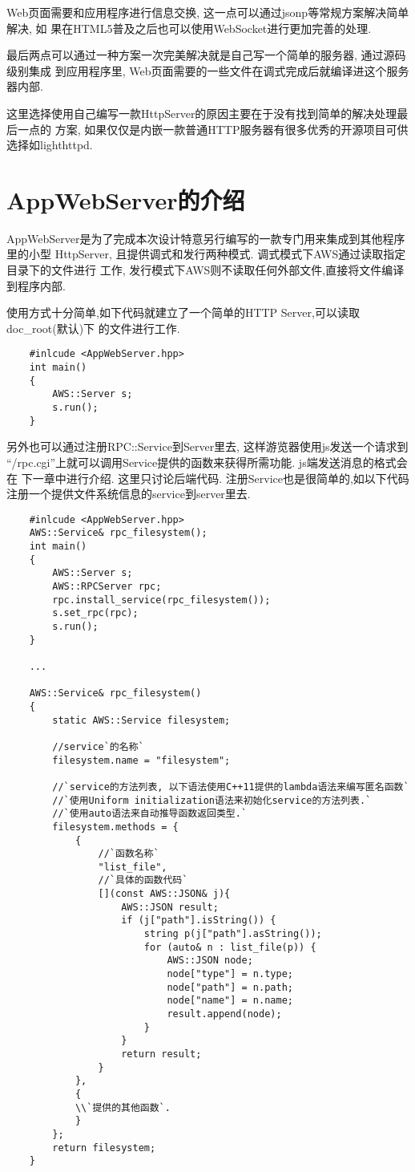 Web页面需要和应用程序进行信息交换, 这一点可以通过jsonp等常规方案解决简单解决, 如
果在HTML5普及之后也可以使用WebSocket进行更加完善的处理.

最后两点可以通过一种方案一次完美解决就是自己写一个简单的服务器, 通过源码级别集成
到应用程序里, Web页面需要的一些文件在调式完成后就编译进这个服务器内部.

这里选择使用自己编写一款HttpServer的原因主要在于没有找到简单的解决处理最后一点的
方案, 如果仅仅是内嵌一款普通HTTP服务器有很多优秀的开源项目可供选择如lighthttpd.

\section{AppWebServer的介绍}
AppWebServer是为了完成本次设计特意另行编写的一款专门用来集成到其他程序里的小型
HttpServer, 且提供调式和发行两种模式. 调式模式下AWS通过读取指定目录下的文件进行
工作, 发行模式下AWS则不读取任何外部文件,直接将文件编译到程序内部.

使用方式十分简单,如下代码就建立了一个简单的HTTP Server,可以读取doc\_root(默认)下
的文件进行工作.
\begin{lstlisting}
	#inlcude <AppWebServer.hpp>
	int main()
	{
		AWS::Server s;
		s.run();
	}
\end{lstlisting}
另外也可以通过注册RPC::Service到Server里去, 这样游览器使用js发送一个请求到
``/rpc.cgi''上就可以调用Service提供的函数来获得所需功能. js端发送消息的格式会在
下一章中进行介绍.
这里只讨论后端代码.
注册Service也是很简单的,如以下代码注册一个提供文件系统信息的service到server里去.
\begin{lstlisting}
	#inlcude <AppWebServer.hpp>
	AWS::Service& rpc_filesystem();
	int main()
	{
		AWS::Server s;
		AWS::RPCServer rpc;
		rpc.install_service(rpc_filesystem());
		s.set_rpc(rpc);
		s.run();
	}

	...

	AWS::Service& rpc_filesystem()
	{
		static AWS::Service filesystem;

		//service`的名称`
		filesystem.name = "filesystem";

		//`service的方法列表, 以下语法使用C++11提供的lambda语法来编写匿名函数`
		//`使用Uniform initialization语法来初始化service的方法列表.`
		//`使用auto语法来自动推导函数返回类型.`
		filesystem.methods = {
			{
				//`函数名称`
				"list_file",  
				//`具体的函数代码`
				[](const AWS::JSON& j){
					AWS::JSON result;
					if (j["path"].isString()) {
						string p(j["path"].asString());
						for (auto& n : list_file(p)) {
							AWS::JSON node;
							node["type"] = n.type;
							node["path"] = n.path;
							node["name"] = n.name;
							result.append(node);
						}
					} 
					return result;
				}
			},
			{
			\\`提供的其他函数`.
			}
		};
		return filesystem;
	}
\end{lstlisting}

